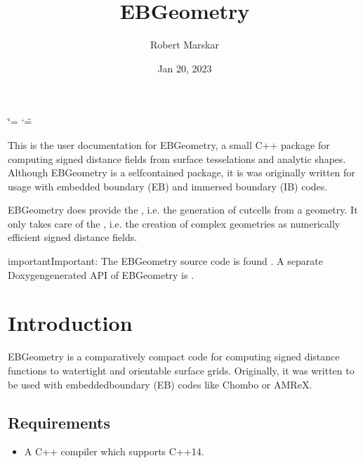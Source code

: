 \documentclass[letterpaper,10pt,english]{sphinxmanual}
\title{EBGeometry}
\date{Jan 20, 2023}
\author{Robert Marskar}
\begin{document}
\ifdefined\shorthandoff
  \ifnum\catcode`\=\string=\active\shorthandoff{=}\fi
  \ifnum\catcode`\"=\active{}\fi
\fi

\pagestyle{empty}
\sphinxmaketitle
\pagestyle{plain}
\sphinxtableofcontents
\pagestyle{normal}
\label{\detokenize{index::doc}}


\sphinxAtStartPar
This is the user documentation for EBGeometry, a small C++ package for computing signed distance fields from surface tesselations and analytic shapes.
Although EBGeometry is a self\sphinxhyphen{}contained package, it is was originally written for usage with embedded boundary (EB) and immersed boundary (IB) codes.

\sphinxAtStartPar
EBGeometry does provide the , i.e. the generation of cut\sphinxhyphen{}cells from a geometry.
It only takes care of the , i.e. the creation of complex geometries as numerically efficient signed distance fields.

\begin{sphinxadmonition}{important}{Important:}
\sphinxAtStartPar
The EBGeometry source code is found .
A separate Doxygen\sphinxhyphen{}generated API of EBGeometry is .
\end{sphinxadmonition}




\chapter{Introduction}
\label{\detokenize{index:introduction}}
\sphinxstepscope
{}\label{\detokenize{Introduction:chap-introduction}}
\sphinxAtStartPar
EBGeometry is a comparatively compact code for computing signed distance functions to watertight and orientable surface grids.
Originally, it was written to be used with embedded\sphinxhyphen{}boundary (EB) codes like Chombo or AMReX.


\section{Requirements}
\label{\detokenize{Introduction:requirements}}\label{\detokenize{Introduction::doc}}\begin{itemize}
\item {} 
\sphinxAtStartPar
A C++ compiler which supports C++14.

\end{itemize}
\end{document}

